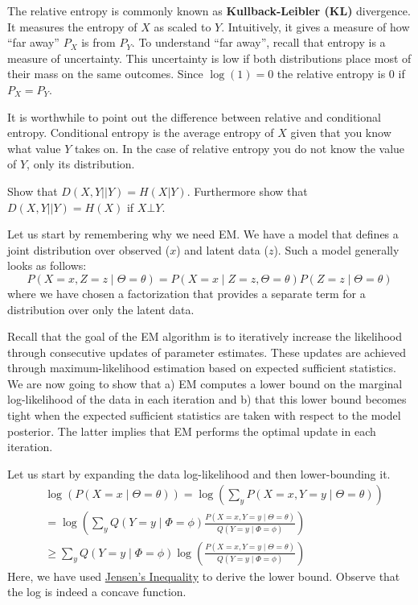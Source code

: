 \documentclass[a4paper,11pt,leqno]{report}\usepackage[]{graphicx}\usepackage[]{color}
\newcommand{\chris}[1]{ \textcolor{blue}{\textbf{Chris:} #1}}
\begin{document}
The relative entropy is commonly known as \textbf{Kullback-Leibler (KL)} divergence. It measures the entropy of $ X $ as scaled to $ Y $. Intuitively,
it gives a measure of how ``far away'' $ P_{X} $ is from $ P_{Y} $. To
understand ``far away'', recall that entropy is a measure of
uncertainty. 
This uncertainty is low if both distributions place most
of their mass on the same outcomes. Since $ \log(1) = 0 $ the relative entropy is 0 if $ P_{X} = P_{Y} $.

It is worthwhile to point out the difference between relative and conditional entropy. Conditional entropy is the average entropy of $ X $ given that you
know what value $ Y $ takes on. In the case of relative entropy you do not know the value of $ Y $, only its distribution.

\begin{Exercise}
Show that $ D(X,Y||Y) = H(X | Y) $. Furthermore show that $ D(X,Y||Y) = H(X) $ if $ X\bot Y $.
\end{Exercise}


Let us start by remembering why we need EM. We have a model that defines a joint distribution
over observed ($ x $) and latent data ($ z $). Such a model generally looks as follows:
\begin{equation}
P(X=x, Z=z  \mid  \Theta = \theta) = P(X=x \mid Z=z, \Theta=\theta) P(Z=z \mid \Theta = \theta)
\end{equation}
where we have chosen a factorization that provides a separate term for a distribution over only the
latent data.

Recall that the goal of the EM algorithm is to iteratively increase the likelihood through consecutive
updates of parameter estimates. These updates are achieved through maximum-likelihood estimation based
on expected sufficient statistics. We are now going to show that a) EM computes a lower bound on the
marginal log-likelihood of the data in each iteration and b) that this lower bound becomes tight when the
expected sufficient statistics are taken with respect to the model posterior. The latter implies that
EM performs the optimal update in each iteration.

Let us start by expanding the data log-likelihood and then lower-bounding it.
\begin{align}
&\log(P(X=x \mid \Theta=\theta)) = \log(\sum_y P(X=x, Y=y \mid  \Theta = \theta))  \\
&= \log\left(\sum_{y} Q(Y=y \mid \Phi=\phi)\frac{P(X=x, Y=y \mid  \Theta = \theta)}{Q(Y=y \mid \Phi=\phi)}\right) \\
&\geq \sum_{y} Q(Y=y \mid \Phi=\phi) \log\left(\frac{P(X=x, Y=y \mid  \Theta = \theta)}{Q(Y=y \mid \Phi=\phi)}\right)
\label{eq:ELBO1}
\end{align}
Here, we have used \href{https://en.wikipedia.org/wiki/Jensen\%27s_inequality}{Jensen's Inequality} to
derive the lower bound. Observe that the log is indeed a concave function. 
\end{document}
